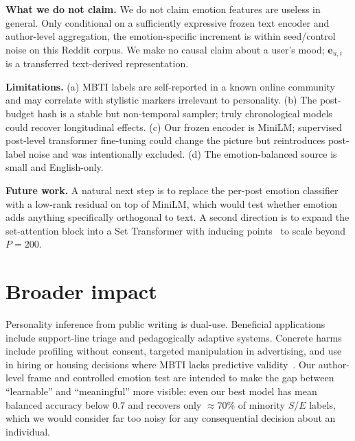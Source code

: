 \documentclass{article}
\begin{document}
\textbf{What we do not claim.} We do not claim emotion features are useless in general. Only conditional on a sufficiently expressive frozen text encoder and author-level aggregation, the emotion-specific increment is within seed/control noise on this Reddit corpus. We make no causal claim about a user's mood; $\mathbf{e}_{u,i}$ is a transferred text-derived representation.

\textbf{Limitations.} (a) MBTI labels are self-reported in a known online community and may correlate with stylistic markers irrelevant to personality. (b) The post-budget hash is a stable but non-temporal sampler; truly chronological models could recover longitudinal effects. (c) Our frozen encoder is MiniLM; supervised post-level transformer fine-tuning could change the picture but reintroduces post-label noise and was intentionally excluded. (d) The emotion-balanced source is small and English-only.

\textbf{Future work.} A natural next step is to replace the per-post emotion classifier with a low-rank residual on top of MiniLM, which would test whether emotion adds anything specifically orthogonal to text. A second direction is to expand the set-attention block into a Set Transformer with inducing points~\citep{lee2019settransformer} to scale beyond $P{=}200$.

\section{Broader impact}

Personality inference from public writing is dual-use. Beneficial applications include support-line triage and pedagogically adaptive systems. Concrete harms include profiling without consent, targeted manipulation in advertising, and use in hiring or housing decisions where MBTI lacks predictive validity~\citep{pittenger1993utility}. Our author-level frame and controlled emotion test are intended to make the gap between ``learnable'' and ``meaningful'' more visible: even our best model has mean balanced accuracy below $0.7$ and recovers only $\approx 70\%$ of minority $S$/$E$ labels, which we would consider far too noisy for any consequential decision about an individual.
\end{document}
